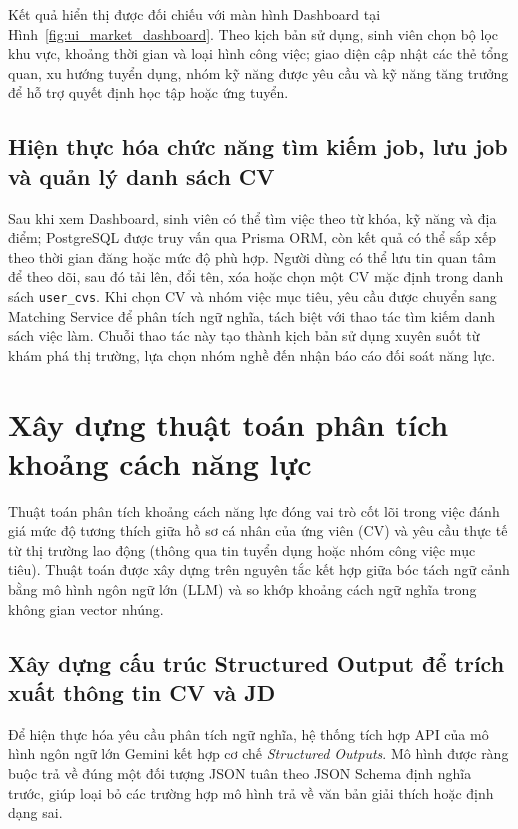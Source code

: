 Kết quả hiển thị được đối chiếu với màn hình Dashboard tại Hình~\ref{fig:ui_market_dashboard}. Theo kịch bản sử dụng, sinh viên chọn bộ lọc khu vực, khoảng thời gian và loại hình công việc; giao diện cập nhật các thẻ tổng quan, xu hướng tuyển dụng, nhóm kỹ năng được yêu cầu và kỹ năng tăng trưởng để hỗ trợ quyết định học tập hoặc ứng tuyển.

\subsection{Hiện thực hóa chức năng tìm kiếm job, lưu job và quản lý danh sách CV}

Sau khi xem Dashboard, sinh viên có thể tìm việc theo từ khóa, kỹ năng và địa điểm; PostgreSQL được truy vấn qua Prisma ORM, còn kết quả có thể sắp xếp theo thời gian đăng hoặc mức độ phù hợp. Người dùng có thể lưu tin quan tâm để theo dõi, sau đó tải lên, đổi tên, xóa hoặc chọn một CV mặc định trong danh sách \texttt{user\_cvs}. Khi chọn CV và nhóm việc mục tiêu, yêu cầu được chuyển sang Matching Service để phân tích ngữ nghĩa, tách biệt với thao tác tìm kiếm danh sách việc làm. Chuỗi thao tác này tạo thành kịch bản sử dụng xuyên suốt từ khám phá thị trường, lựa chọn nhóm nghề đến nhận báo cáo đối soát năng lực.

\section{Xây dựng thuật toán phân tích khoảng cách năng lực}
\label{sec:skill_algorithm}

Thuật toán phân tích khoảng cách năng lực đóng vai trò cốt lõi trong việc đánh giá mức độ tương thích giữa hồ sơ cá nhân của ứng viên (CV) và yêu cầu thực tế từ thị trường lao động (thông qua tin tuyển dụng hoặc nhóm công việc mục tiêu). Thuật toán được xây dựng trên nguyên tắc kết hợp giữa bóc tách ngữ cảnh bằng mô hình ngôn ngữ lớn (LLM) và so khớp khoảng cách ngữ nghĩa trong không gian vector nhúng.

\subsection{Xây dựng cấu trúc Structured Output để trích xuất thông tin CV và JD}

Để hiện thực hóa yêu cầu phân tích ngữ nghĩa, hệ thống tích hợp API của mô hình ngôn ngữ lớn Gemini kết hợp cơ chế \textit{Structured Outputs}. Mô hình được ràng buộc trả về đúng một đối tượng JSON tuân theo JSON Schema định nghĩa trước, giúp loại bỏ các trường hợp mô hình trả về văn bản giải thích hoặc định dạng sai.

